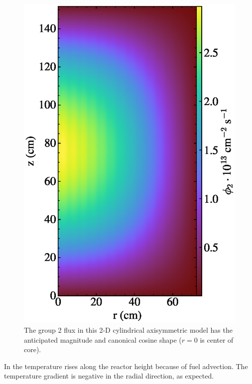 \documentclass{article}
\begin{document}
\begin{figure}[htpb]
  \centering
  \includegraphics{2d_gamma_heating_group2.eps}
        \caption{The group 2 flux in this 2-D cylindrical axisymmetric model
        has the anticipated magnitude and canonical cosine shape ($r=0$ is center of core). }
  \label{fig:group2}
\end{figure}

In  the temperature rises along the reactor height because of
fuel advection. The temperature gradient is negative in the
radial direction, as expected.
\end{document}
